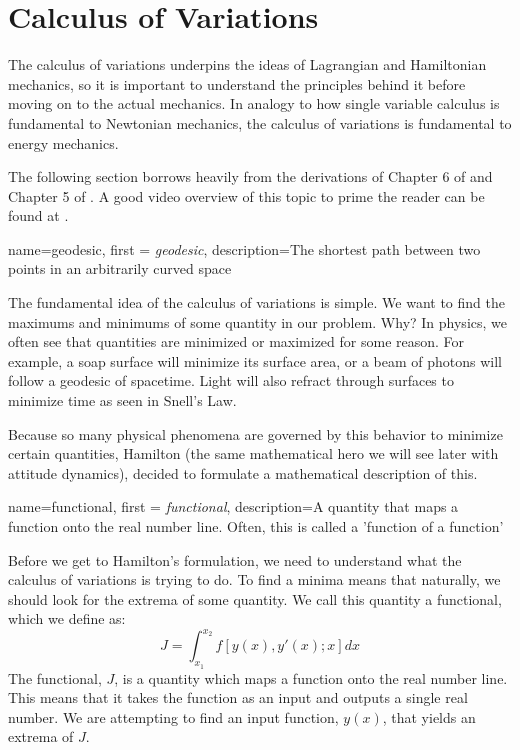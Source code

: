 \documentclass[12pt]{report}
\begin{document}
\section{Calculus of Variations}

The calculus of variations underpins the ideas of Lagrangian and Hamiltonian mechanics, so it is important to understand the principles behind it before moving on to the actual mechanics. In analogy to how single variable calculus is fundamental to Newtonian mechanics, the calculus of variations is fundamental to energy mechanics.

The following section borrows heavily from the derivations of Chapter 6 of  \cite{thornton_classical_nodate} and Chapter 5 of  \cite{noauthor_variational_2017}. A good video overview of this topic to prime the reader can be found at \cite{veritasium_closest_2024}.

{
    name=geodesic,
    first = {\textit{geodesic}},
    description={The shortest path between two points in an arbitrarily curved space}
}

The fundamental idea of the calculus of variations is simple. We want to find the maximums and minimums of some quantity in our problem. Why? In physics, we often see that quantities are minimized or maximized for some reason. For example, a soap surface will minimize its surface area, or a beam of photons will follow a \gls{geodesic} of spacetime. Light will also refract through surfaces to minimize time as seen in Snell's Law. 

Because so many physical phenomena are governed by this behavior to minimize certain quantities, Hamilton (the same mathematical hero we will see later with attitude dynamics), decided to formulate a mathematical description of this.

{
    name=functional,
    first = {\textit{functional}},
    description={A quantity that maps a function onto the real number line. Often,  this is called a 'function of a function'}
}

Before we get to Hamilton's formulation, we need to understand what the calculus of variations is trying to do. To find a minima means that naturally, we should look for the extrema of some quantity. We call this quantity a \gls{functional}, which we define as:
\begin{equation}\label{eq:functional}
    J=\int_{x_1}^{x_2}f\left[y(x),y'(x);x\right]{dx}
\end{equation}
The \gls{functional}, $J$, is a quantity which maps a function onto the real number line. This means that it takes the function as an input and outputs a single real number. We are attempting to find an input function, $y(x)$, that yields an extrema of $J$. 
\end{document}

